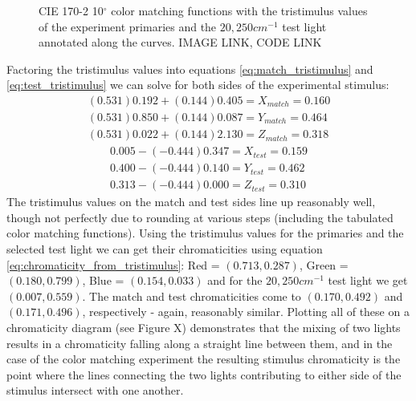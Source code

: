\documentclass[twocolumn]{article}
\newif\ifinvert
\begin{document}
\begin{figure*}[h]
    \ifinvert
        
    \else
        
    \fi
    \caption{CIE 170-2 10$^\circ$ color matching functions with the tristimulus values of the experiment primaries and the $20,250cm^{-1}$ test light annotated along the curves.  IMAGE LINK, CODE LINK}\label{fig:color_matching_experiment_tristimulus}
\end{figure*}
Factoring the tristimulus values into equations \ref{eq:match_tristimulus} and \ref{eq:test_tristimulus} we can solve for both sides of the experimental stimulus:
\begin{equation}
    \begin{aligned}
        (0.531)0.192+(0.144)0.405=X_{match}=0.160\\
        (0.531)0.850+(0.144)0.087=Y_{match}=0.464\\
        (0.531)0.022+(0.144)2.130=Z_{match}=0.318
    \end{aligned}
\end{equation}
\begin{equation}
    \begin{aligned}
        0.005-(-0.444)0.347=X_{test}=0.159\\
        0.400-(-0.444)0.140=Y_{test}=0.462\\
        0.313-(-0.444)0.000=Z_{test}=0.310
    \end{aligned}
\end{equation}
The tristimulus values on the match and test sides line up reasonably well, though not perfectly due to rounding at various steps (including the tabulated color matching functions).  Using the tristimulus values for the primaries and the selected test light we can get their chromaticities using equation \ref{eq:chromaticity_from_tristimulus}: Red = $(0.713,0.287)$, Green = $(0.180,0.799)$, Blue = $(0.154,0.033)$ and for the $20,250cm^{-1}$ test light we get $(0.007,0.559)$.  The match and test chromaticities come to $(0.170,0.492)$ and $(0.171,0.496)$, respectively - again, reasonably similar.  Plotting all of these on a chromaticity diagram (see Figure X) demonstrates that the mixing of two lights results in a chromaticity falling along a straight line between them, and in the case of the color matching experiment the resulting stimulus chromaticity is the point where the lines connecting the two lights contributing to either side of the stimulus intersect with one another.
\end{document}

